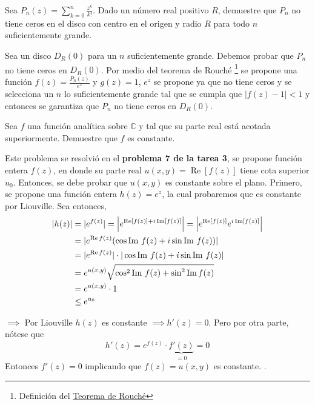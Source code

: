 \begin{problema}[20p]
    Sea $P_n(z)=\sum_{k=0}^n \frac{z^k}{k !}$. Dado un número real positivo $R$, demuestre que $P_n$ no tiene ceros en el disco con centro en el origen y radio $R$ para todo $n$ suficientemente grande.
    \begin{dem}
        Sea un disco $D_R(0)$ para un $n$ suficientemente grande. Debemos probar que $P_n$ no tiene ceros en $D_R(0)$. Por medio del teorema de Rouché \footnote{Definición del \href{https://en.wikipedia.org/wiki/Rouché\%27s_theorem}{Teorema de Rouché}} se propone una función $f(z)=\frac{P_n(z)}{e^z}$ y $g(z)=1$, $e^z$ se propone ya que no tiene ceros y se selecciona un $n$ lo suficientemente grande tal que se cumpla que $|f(z)-1|<1$ y entonces se garantiza que $P_n$ no tiene ceros en $D_R(0)$.
    \end{dem}
\end{problema}

\begin{problema}[20p]
    Sea $f$ una función analítica sobre $\mathbb{C}$ y tal que su parte real está acotada superiormente. Demuestre que $f$ es constante.
    \begin{dem}
        Este problema se resolvió en el \textbf{problema 7 de la tarea 3},
        se propone función entera $f(z)$, en donde su parte real $u(x, y)=\operatorname{Re}[f(z)]$ tiene cota superior $u_0$.  Entonces, se debe probar que $u(x, y)$ es constante sobre el plano. Primero, se propone una función entera $h(z)=e^z$, la cual probaremos que es constante por Liouville. Sea entonces, 
    \begin{align*} |h(z)| &= |e^{f(z)}| = \left|e^{\operatorname{Re}[f(z)]+i\operatorname{Im}[f(z)]}\right| =  \left|e^{\operatorname{Re}[f(z)]}e^{i\operatorname{Im}[f(z)]}\right|\\
        &= |e^{\textup{Re}\,f(z)} (\cos\operatorname{Im}\,f(z) +i\sin \operatorname{Im}\,f(z))| \\ &= |e^{\textup{Re}\,f(z)}| \cdot |\cos \operatorname{Im}\,f(z) +i\sin \operatorname{Im}\,f(z)| \\ &= e^{u(x,y)} \sqrt{\cos^2\operatorname{Im}\,f(z) + \sin^2\textup{Im}\,f(z)}\\
        &= e^{u(x,y)} \cdot 1\\
        &\le e^{u_0} \end{align*} 

   $\implies$ Por Liouville $h(z)$ es constante $\implies h'(z)=0$. Pero por otra parte, nótese que 
   $$h'(z)=e^{f(z)}\cdot \underbrace{f'(z)}_{=0}=0$$ 
   Entonces $f'(z)=0$ implicando que $f(z)=u(x,y)$ es constante. 
        . 
    \end{dem}
\end{problema}






%
%

